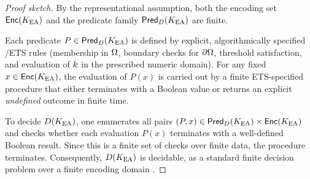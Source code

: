 \begin{proof}[Proof sketch]
By the representational assumption, both the encoding set
\(\mathsf{Enc}(K_{\mathrm{EA}})\) and the predicate family \(\mathsf{Pred}_D(K_{\mathrm{EA}})\) are
finite.

Each predicate \(P \in \mathsf{Pred}_D(K_{\mathrm{EA}})\) is defined by explicit,
algorithmically specified \OC{}/ETS rules (membership in \(\Omega\), boundary
checks for \(\partial \Omega\), threshold satisfaction, and evaluation of
\(k\) in the prescribed numeric domain). For any fixed
\(x \in \mathsf{Enc}(K_{\mathrm{EA}})\), the evaluation of \(P(x)\) is carried out by a
finite ETS-specified procedure that either terminates with a Boolean value or
returns an explicit \emph{undefined} outcome in finite time.

To decide \(D(K_{\mathrm{EA}})\), one enumerates all pairs
\((P,x) \in \mathsf{Pred}_D(K_{\mathrm{EA}}) \times \mathsf{Enc}(K_{\mathrm{EA}})\) and checks whether
each evaluation \(P(x)\) terminates with a well-defined Boolean result. Since
this is a finite set of checks over finite data, the procedure terminates.
Consequently, \(D(K_{\mathrm{EA}})\) is decidable, as a standard finite decision problem
over a finite encoding domain \cite{Sipser2012,Clarke2018}.
\end{proof}

